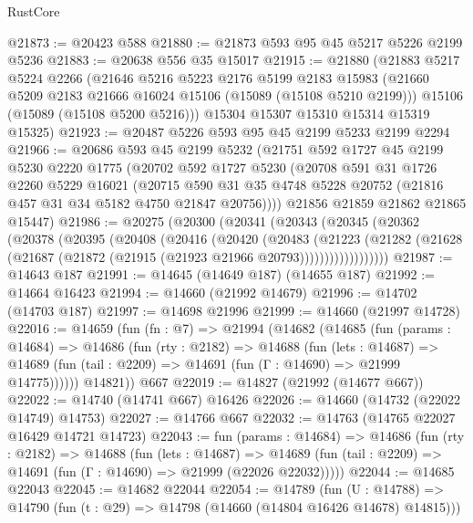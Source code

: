 \begin{lexlean}{RustCore}
\begin{coremodule}
@21873 := @20423 @588
@21880 := @21873 @593 @95 @45 @5217 @5226 @2199 @5236
@21883 := @20638 @556 @35 @15017
@21915 := @21880
    (@21883
      @5217
      @5224
      @2266
      (@21646
        @5216
        @5223
        @2176
        @5199
        @2183
        @15983
        (@21660 @5209 @2183 @21666 @16024 @15106 (@15089 (@15108 @5210 @2199)))
        @15106
        (@15089 (@15108 @5200 @5216)))
      @15304
      @15307
      @15310
      @15314
      @15319
      @15325)
@21923 := @20487 @5226 @593 @95 @45 @2199 @5233 @2199 @2294
@21966 := @20686
    @593
    @45
    @2199
    @5232
    (@21751
      @592
      @1727
      @45
      @2199
      @5230
      @2220
      @1775
      (@20702
        @592
        @1727
        @5230
        (@20708
          @591
          @31
          @1726
          @2260
          @5229
          @16021
          (@20715 @590 @31 @35 @4748 @5228 @20752 (@21816 @457 @31 @34 @5182 @4750 @21847 @20756))))
      @21856
      @21859
      @21862
      @21865
      @15447)
@21986 := @20275
    (@20300
      (@20341
        (@20343
          (@20345
            (@20362
              (@20378
                (@20395
                  (@20408
                    (@20416
                      (@20420
                        (@20483
                          (@21223
                            (@21282
                              (@21628
                                (@21687 (@21872 (@21915 (@21923 @21966 @20793))))))))))))))))))
@21987 := @14643 @187
@21991 := @14645 (@14649 @187) (@14655 @187)
@21992 := @14664 @16423
@21994 := @14660 (@21992 @14679)
@21996 := @14702 (@14703 @187)
@21997 := @14698 @21996
@21999 := @14660 (@21997 @14728)
@22016 := @14659
    (fun (fn : @7) =>
    @21994
      (@14682
        (@14685
          (fun (params : @14684) =>
          @14686
            (fun (rty : @2182) =>
            @14688
              (fun (lets : @14687) =>
              @14689 (fun (tail : @2209) => @14691 (fun (Γ : @14690) => @21999 @14775))))))
        @14821))
    @667
@22019 := @14827 (@21992 (@14677 @667))
@22022 := @14740 (@14741 @667) @16426
@22026 := @14660 (@14732 (@22022 @14749) @14753)
@22027 := @14766 @667
@22032 := @14763 (@14765 @22027 @16429 @14721 @14723)
@22043 := fun (params : @14684) =>
  @14686
    (fun (rty : @2182) =>
    @14688
      (fun (lets : @14687) =>
      @14689 (fun (tail : @2209) => @14691 (fun (Γ : @14690) => @21999 (@22026 @22032)))))
@22044 := @14685 @22043
@22045 := @14682 @22044
@22054 := @14789
    (fun (U : @14788) => @14790 (fun (t : @29) => @14798 (@14660 (@14804 @16426 @14678) @14815)))

\end{coremodule}
\end{lexlean}
